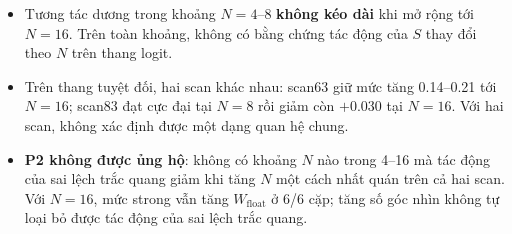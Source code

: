 \documentclass[11pt,a4paper]{article}
\begin{document}
\begin{itemize}
  \item Tương tác dương trong khoảng $N=4$--8 \textbf{không kéo dài} khi mở rộng tới $N=16$. Trên toàn khoảng, không có bằng chứng tác động của $S$ thay đổi theo $N$ trên thang logit.
  \item Trên thang tuyệt đối, hai scan khác nhau: scan63 giữ mức tăng 0.14--0.21 tới $N=16$; scan83 đạt cực đại tại $N=8$ rồi giảm còn $+0.030$ tại $N=16$. Với hai scan, không xác định được một dạng quan hệ chung.
  \item \textbf{P2 không được ủng hộ}: không có khoảng $N$ nào trong 4--16 mà tác động của sai lệch trắc quang giảm khi tăng $N$ một cách nhất quán trên cả hai scan. Với $N=16$, mức strong vẫn tăng $W_{\text{float}}$ ở 6/6 cặp; tăng số góc nhìn không tự loại bỏ được tác động của sai lệch trắc quang.
\end{itemize}
\end{document}
